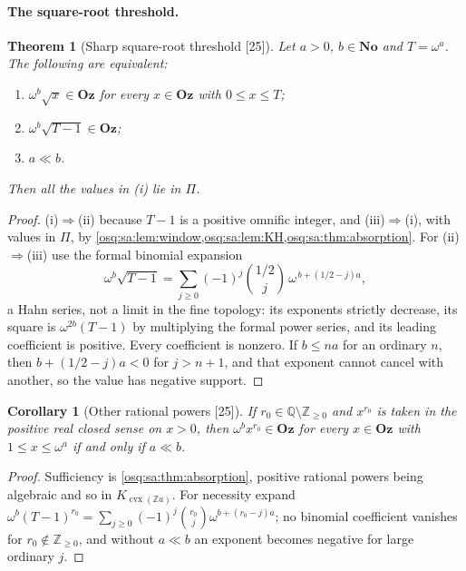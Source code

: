 \documentclass[11pt,letterpaper]{article}
\numberwithin{equation}{section}
\newtheorem{theorem}{Theorem}[section]
\newtheorem{corollary}[corollary]{Corollary}
\theoremstyle{definition}
\theoremstyle{remark}
\theoremstyle{plain}
\newcommand{\No}{\mathbf{No}}
\newcommand{\Oz}{\mathbf{Oz}}
\newcommand{\Z}{\mathbb Z}
\newcommand{\Q}{\mathbb Q}
\newcommand{\src}[1]{\textup{\textsf{[#1]}}}
\begin{document}
\paragraph{The square-root threshold.}

\begin{theorem}[Sharp square-root threshold \src{25}]\label{osq:sa:thm:radical}
Let $a>0$, $b\in\No$ and $T=\omega^a$. The following are equivalent:
\begin{enumerate}
\item $\omega^b\sqrt x\in\Oz$ for every $x\in\Oz$ with $0\le x\le T$;
\item $\omega^b\sqrt{T-1}\in\Oz$;
\item $a\ll b$.
\end{enumerate}
Then all the values in (i) lie in $\Pi$.
\end{theorem}
\begin{proof}
(i)$\Rightarrow$(ii) because $T-1$ is a positive omnific integer, and (iii)$\Rightarrow$(i), with values in $\Pi$, by
\cref{osq:sa:lem:window,osq:sa:lem:KH,osq:sa:thm:absorption}. For (ii)$\Rightarrow$(iii) use the formal binomial expansion
\begin{equation}\label{osq:sa:eq:radical}
 \omega^b\sqrt{T-1}=\sum_{j\ge0}(-1)^j\binom{1/2}j\,\omega^{\,b+(1/2-j)a},
\end{equation}
a Hahn series, not a limit in the fine topology: its exponents strictly decrease, its square is $\omega^{2b}(T-1)$ by multiplying the formal power series,
and its leading coefficient is positive. Every coefficient is nonzero. If $b\le na$ for an ordinary $n$, then $b+(1/2-j)a<0$ for $j>n+1$, and that exponent
cannot cancel with another, so the value has negative support.
\end{proof}

\begin{corollary}[Other rational powers \src{25}]\label{osq:sa:cor:powers}
If $r_0\in\Q\setminus\Z_{\ge0}$ and $x^{r_0}$ is taken in the positive real closed sense on $x>0$, then $\omega^bx^{r_0}\in\Oz$ for every $x\in\Oz$ with
$1\le x\le\omega^a$ if and only if $a\ll b$.
\end{corollary}
\begin{proof}
Sufficiency is \cref{osq:sa:thm:absorption}, positive rational powers being algebraic and so in $K_{\operatorname{cvx}(\Z a)}$. For necessity expand
$\omega^b(T-1)^{r_0}=\sum_{j\ge0}(-1)^j\binom{r_0}j\omega^{b+(r_0-j)a}$; no binomial coefficient vanishes for $r_0\notin\Z_{\ge0}$, and without $a\ll b$ an
exponent becomes negative for large ordinary $j$.
\end{proof}
\end{document}
